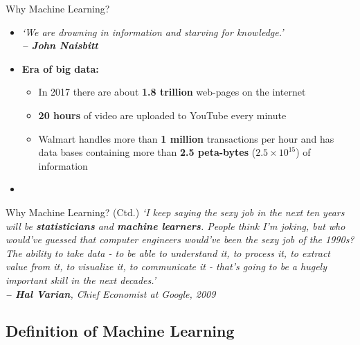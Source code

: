 \begin{frame}{Why Machine Learning?}{}
	\begin{itemize}
		\item \textit{`We are drowning in information and starving for knowledge.' \\
			\hfill\textbf{-- John Naisbitt}}
		\item \textbf{Era of big data:}
		\begin{itemize}
			\item In 2017 there are about \textbf{1.8 trillion} web-pages on the internet
			\item \textbf{20 hours} of video are uploaded to YouTube every minute
			\item Walmart handles more than \textbf{1 million} transactions per hour and has data bases containing more 
				than \textbf{2.5 peta-bytes} ($2.5 \times 10^15$) of information
		\end{itemize}
		\item {}
	\end{itemize}
\end{frame}


\begin{frame}{Why Machine Learning? (Ctd.)}{}
	\textit{`I keep saying the sexy job in the next ten years will be \textbf{statisticians} and \textbf{machine learners}.
		People think I’m joking, but who would’ve guessed that computer engineers would’ve been the sexy job of the
		1990s? The ability to take data - to be able to understand it, to process it, to extract value from it, to visualize it,
		to communicate it - that’s going to be a hugely important skill in the next decades.' \\
		\hfill\textbf{-- Hal Varian}, Chief Economist at Google, 2009}
\end{frame}


\subsection{Definition of Machine Learning}

